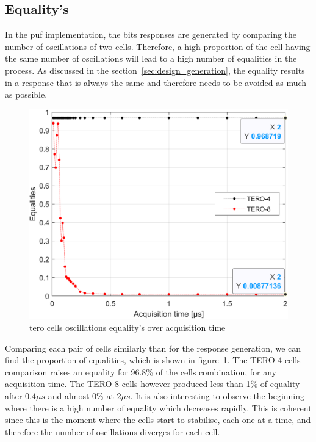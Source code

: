 \newpage
\subsection{Equality's}

In the \acrshort{puf} implementation, the bits responses are generated by comparing the number of oscillations of two cells. Therefore, a high proportion of the cell having the same number of oscillations will lead to a high number of equalities in the process. As discussed in the section~\ref{sec:design_generation}, the equality results in a response that is always the same and therefore needs to be avoided as much as possible.


\begin{figure}[H]
    \centering
    \includegraphics[width=0.8\linewidth]{images/all_oscillations_equality.png}
    \caption{\label{fig:tero_all_oscillation_eq}\acrshort{tero} cells oscillations equality's over acquisition time}
\end{figure}

Comparing each pair of cells similarly than for the response generation, we can find the proportion of equalities, which is shown in figure~\ref{fig:tero_all_oscillation_eq}. The TERO-4 cells comparison raises an equality for 96.8\% of the cells combination, for any acquisition time. The TERO-8 cells however produced less than 1\% of equality after $0.4 \mu s$ and almost 0\% at $2\mu s$. It is also interesting to observe the beginning where there is a high number of equality which decreases rapidly. This is coherent since this is the moment where the cells start to stabilise, each one at a time, and therefore the number of oscillations diverges for each cell.\\

